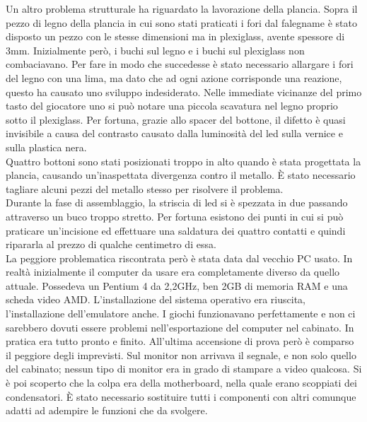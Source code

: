 Un altro problema strutturale ha riguardato la lavorazione della plancia. Sopra il pezzo di legno della plancia in cui sono stati praticati i fori dal falegname è stato disposto un pezzo con le stesse dimensioni ma in plexiglass, avente spessore di 3mm. Inizialmente però, i buchi sul legno e i buchi sul plexiglass non combaciavano. Per fare in modo che succedesse è stato necessario allargare i fori del legno con una lima, ma dato che ad ogni azione corrisponde una reazione, questo ha causato uno sviluppo indesiderato. Nelle immediate vicinanze del primo tasto del giocatore uno si può notare una piccola scavatura nel legno proprio sotto il plexiglass. Per fortuna, grazie allo spacer del bottone, il difetto è quasi invisibile a causa del contrasto causato dalla luminosità del led sulla vernice e sulla plastica nera.\\Quattro bottoni sono stati posizionati troppo in alto quando è stata progettata la plancia, causando un'inaspettata divergenza contro il metallo. È stato necessario tagliare alcuni pezzi del metallo stesso per risolvere il problema.\\Durante la fase di assemblaggio, la striscia di led si è spezzata in due passando attraverso un buco troppo stretto. Per fortuna esistono dei punti in cui si può praticare un’incisione ed effettuare una saldatura dei quattro contatti e quindi ripararla al prezzo di qualche centimetro di essa.\\La peggiore problematica riscontrata però è stata data dal vecchio PC usato. In realtà inizialmente il computer da usare era completamente diverso da quello attuale. Possedeva un Pentium 4 da 2,2GHz, ben 2GB di memoria RAM e una scheda video AMD. L’installazione del sistema operativo era riuscita, l’installazione dell’emulatore anche. I giochi funzionavano perfettamente e non ci sarebbero dovuti essere problemi nell’esportazione del computer nel cabinato. In pratica era tutto pronto e finito. All’ultima accensione di prova però è comparso il peggiore degli imprevisti. Sul monitor non arrivava il segnale, e non solo quello del cabinato; nessun tipo di monitor era in grado di stampare a video qualcosa. Si è poi scoperto che la colpa era della motherboard, nella quale erano scoppiati dei condensatori. È stato necessario sostituire tutti i componenti con altri comunque adatti ad adempire le funzioni che da svolgere.

